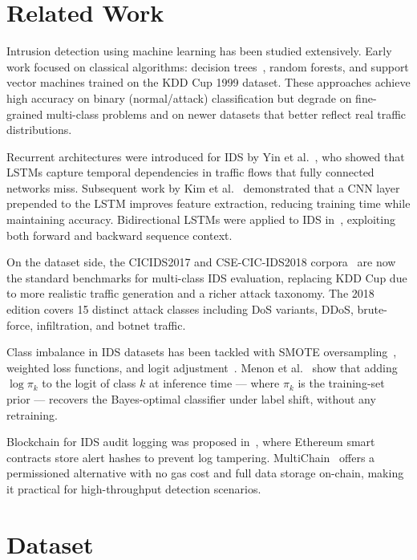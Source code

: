 \documentclass[12pt]{article}
\theoremstyle{plain}
\begin{document}
\section{Related Work}
\label{sec:related}

Intrusion detection using machine learning has been studied extensively. Early work focused on classical algorithms: decision trees~\cite{kdd99}, random forests, and support vector machines trained on the KDD Cup 1999 dataset. These approaches achieve high accuracy on binary (normal/attack) classification but degrade on fine-grained multi-class problems and on newer datasets that better reflect real traffic distributions.

Recurrent architectures were introduced for IDS by Yin et al.~\cite{yin2017rnn}, who showed that LSTMs capture temporal dependencies in traffic flows that fully connected networks miss. Subsequent work by Kim et al.~\cite{kim2020cnn} demonstrated that a CNN layer prepended to the LSTM improves feature extraction, reducing training time while maintaining accuracy. Bidirectional LSTMs were applied to IDS in~\cite{bilstm2020}, exploiting both forward and backward sequence context.

On the dataset side, the CICIDS2017 and CSE-CIC-IDS2018 corpora~\cite{cic2018} are now the standard benchmarks for multi-class IDS evaluation, replacing KDD Cup due to more realistic traffic generation and a richer attack taxonomy. The 2018 edition covers 15 distinct attack classes including DoS variants, DDoS, brute-force, infiltration, and botnet traffic.

Class imbalance in IDS datasets has been tackled with SMOTE oversampling~\cite{smote}, weighted loss functions, and logit adjustment~\cite{logit_adjustment}. Menon et al.~\cite{logit_adjustment} show that adding $\log \pi_k$ to the logit of class $k$ at inference time — where $\pi_k$ is the training-set prior — recovers the Bayes-optimal classifier under label shift, without any retraining.

Blockchain for IDS audit logging was proposed in~\cite{bc_ids2019}, where Ethereum smart contracts store alert hashes to prevent log tampering. MultiChain~\cite{multichain} offers a permissioned alternative with no gas cost and full data storage on-chain, making it practical for high-throughput detection scenarios.

\newpage
\section{Dataset}
\label{sec:dataset}
\end{document}
